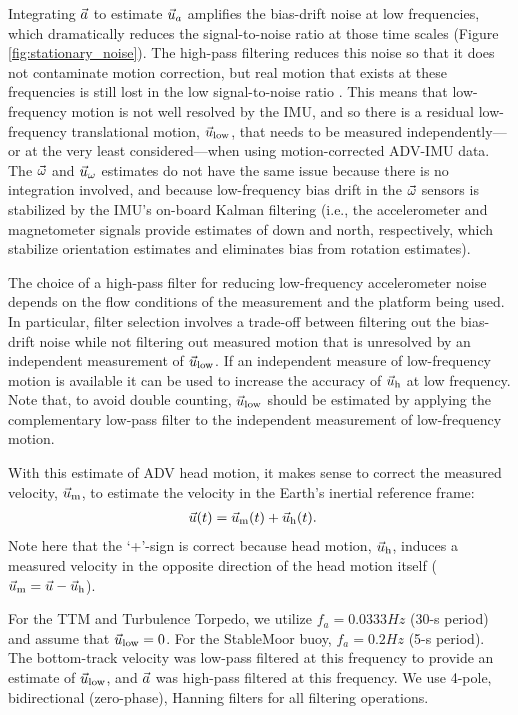 Integrating ${\vec{a}}$ to estimate $\vec{u}_a$ amplifies the bias-drift noise at low frequencies, which dramatically reduces the signal-to-noise ratio at those time scales (Figure \ref{fig:stationary_noise}).  The high-pass filtering reduces this noise so that it does not contaminate motion correction, but real motion that exists at these frequencies is still lost in the low signal-to-noise ratio \cite[]{EgelandPhD2014, VanZwieten++2015}. This means that low-frequency motion is not well resolved by the IMU, and so there is a residual low-frequency translational motion, $\vec{u}_\mathrm{low}$, that needs to be measured independently---or at the very least considered---when using motion-corrected ADV-IMU data. The $\vec{\omega}$ and $\vec{u}_\omega$ estimates do not have the same issue because there is no integration involved, and because low-frequency bias drift in the $\vec{\omega}$ sensors is stabilized by the IMU's on-board Kalman filtering (i.e., the accelerometer and magnetometer signals provide estimates of down and north, respectively, which stabilize orientation estimates and eliminates bias from rotation estimates).

The choice of a high-pass filter for reducing low-frequency accelerometer noise depends on the flow conditions of the measurement and the platform being used. In particular, filter selection involves a trade-off between filtering out the bias-drift noise while not filtering out measured motion that is unresolved by an independent measurement of $\vec{u}_\mathrm{low}$. If an independent measure of low-frequency motion is available it can be used to increase the accuracy of $\vec{u}_\mathrm{h}$ at low frequency. Note that, to avoid double counting, $\vec{u}_\mathrm{low}$ should be estimated by applying the complementary low-pass filter to the independent measurement of low-frequency motion.

With this estimate of ADV head motion, it makes sense to correct the measured velocity, $\vec{u}_\mathrm{m}$, to estimate the velocity in the Earth's inertial reference frame:
\begin{align}
  \label{eqn:u_mot_def}
  \vec{u}(t) & = \vec{u}_\mathrm{m}(t) + \vec{u}_\mathrm{h}(t).
\end{align}
Note here that the `+'-sign is correct because head motion, $\vec{u}_\mathrm{h}$, induces a measured velocity in the opposite direction of the head motion itself ($\vec{u}_\mathrm{m} = \vec{u} - \vec{u}_\mathrm{h}$).

For the TTM and Turbulence Torpedo, we utilize $f_a = 0.0333 Hz$ (30-s period) and assume that $\vec{u}_\mathrm{low} = 0$. For the StableMoor buoy, $f_a = 0.2 Hz$ (5-s
period). The bottom-track velocity was low-pass filtered at this frequency to provide an estimate of $\vec{u}_\mathrm{low}$, and ${\vec{a}}$ was high-pass filtered at this frequency. We use 4-pole, bidirectional (zero-phase), Hanning filters for all filtering operations. 
%
%


